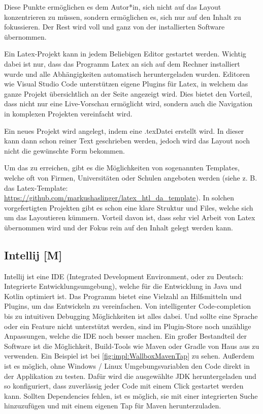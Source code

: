 Diese Punkte ermöglichen es dem Autor*in, sich nicht auf das Layout konzentrieren zu müssen, sondern ermöglichen es, sich nur auf den Inhalt zu fokussieren. Der Rest wird voll und ganz von der installierten Software übernommen.




Ein Latex-Projekt kann in jedem Beliebigen Editor gestartet werden. Wichtig dabei ist nur, dass das Programm Latex an sich auf dem Rechner installiert wurde und alle Abhängigkeiten automatisch heruntergeladen wurden. Editoren wie Visual Studio Code unterstützen eigene Plugins für Latex, in welchem das ganze Projekt übersichtlich an der Seite angezeigt wird. Dies bietet den Vorteil, dass nicht nur eine Live-Vorschau ermöglicht wird, sondern auch die Navigation in komplexen Projekten vereinfacht wird.




Ein neues Projekt wird angelegt, indem eine \grq.tex\grq Datei erstellt wird. In dieser kann dann schon reiner Text geschrieben werden, jedoch wird das Layout noch nicht die gewünschte Form bekommen.


Um das zu erreichen, gibt es die Möglichkeiten von sogenannten Templates, welche oft von Firmen, Universitäten oder Schulen angeboten werden (siehe z. B. das Latex-Template: \url{https://github.com/markushaslinger/latex_htl_da_template}). In solchen vorgefertigten Projekten gibt es schon eine klare Struktur und Files, welche sich um das Layoutieren kümmern. Vorteil davon ist, dass sehr viel Arbeit von Latex übernommen wird und der Fokus rein auf den Inhalt gelegt werden kann.
\cite{latexHeise}
\cite{LatexUniGraz}
\cite{LatexUni}


\subsection{Intellij [M]} 


Intellij ist eine IDE (Integrated Development Environment, oder zu Deutsch: Integrierte Entwicklungsumgebung), welche für die Entwicklung in Java und Kotlin optimiert ist. Das Programm bietet eine Vielzahl an Hilfsmitteln und Plugins, um das Entwickeln zu vereinfachen. Von intelligenter Code-completion bis zu intuitiven Debugging Möglichkeiten ist alles dabei. Und sollte eine Sprache oder ein Feature nicht unterstützt werden, sind im Plugin-Store noch unzählige Anpassungen, welche die IDE noch besser machen. Ein großer Bestandteil der Software ist die Möglichkeit, Build-Tools wie Maven oder Gradle von Haus aus zu verwenden. Ein Beispiel ist bei \ref{fig:impl:WallboxMavenTap} zu sehen. Außerdem ist es möglich, ohne Windows / Linux Umgebungsvariablen den Code direkt in der Applikation zu testen. Dafür wird die ausgewählte JDK heruntergeladen und so konfiguriert, dass zuverlässig jeder Code mit einem Click gestartet werden kann. Sollten Dependencies fehlen, ist es möglich, sie mit einer integrierten Suche hinzuzufügen und mit einem eigenen Tap für Maven herunterzuladen.


